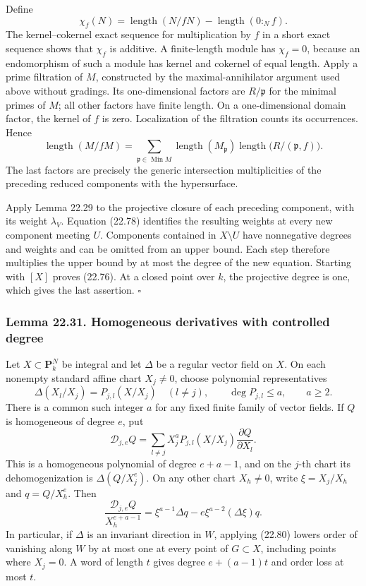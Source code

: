 \documentclass[
  11pt,
  a4paper,
]{article}
\newcounter{none} %
\begin{document}
Define \[
 \chi_f(N)=\operatorname{length}(N/fN)
                   -\operatorname{length}(0:_N f).
 \tag{22.77}
\] The kernel--cokernel exact sequence for multiplication by \(f\) in a
short exact sequence shows that \(\chi_f\) is additive. A finite-length
module has \(\chi_f=0\), because an endomorphism of such a module has
kernel and cokernel of equal length. Apply a prime filtration of \(M\),
constructed by the maximal-annihilator argument used above without
gradings. Its one-dimensional factors are \(R/\mathfrak p\) for the
minimal primes of \(M\); all other factors have finite length. On a
one-dimensional domain factor, the kernel of \(f\) is zero. Localization
of the filtration counts its occurrences. Hence \[
 \operatorname{length}(M/fM)
   =\sum_{\mathfrak p\in\operatorname{Min}M}
       \operatorname{length}(M_{\mathfrak p})
       \operatorname{length}\bigl(R/(\mathfrak p,f)\bigr).
 \tag{22.78}
\] The last factors are precisely the generic intersection
multiplicities of the preceding reduced components with the
hypersurface.

Apply Lemma 22.29 to the projective closure of each preceding component,
with its weight \(\lambda_V\). Equation (22.78) identifies the resulting
weights at every new component meeting \(U\). Components contained in
\(X\setminus U\) have nonnegative degrees and weights and can be omitted
from an upper bound. Each step therefore multiplies the upper bound by
at most the degree of the new equation. Starting with \([X]\) proves
(22.76). At a closed point over \(k\), the projective degree is one,
which gives the last assertion. \(\square\)

\subsubsection{Lemma 22.31. Homogeneous derivatives with controlled
degree}\label{lemma-22.31.-homogeneous-derivatives-with-controlled-degree}

Let \(X\subset\mathbf P^N_k\) be integral and let \(\Delta\) be a
regular vector field on \(X\). On each nonempty standard affine chart
\(X_j\ne0\), choose polynomial representatives \[
 \Delta(X_l/X_j)=P_{j,l}(X/X_j)\quad(l\ne j),
 \qquad \deg P_{j,l}\le a,
 \qquad a\ge2.
 \tag{22.79}
\] There is a common such integer \(a\) for any fixed finite family of
vector fields. If \(Q\) is homogeneous of degree \(e\), put \[
 \mathcal D_{j,e}Q
   =\sum_{l\ne j}X_j^aP_{j,l}(X/X_j)
                       \frac{\partial Q}{\partial X_l}.
 \tag{22.80}
\] This is a homogeneous polynomial of degree \(e+a-1\), and on the
\(j\)-th chart its dehomogenization is \(\Delta(Q/X_j^e)\). On any other
chart \(X_h\ne0\), write \(\xi=X_j/X_h\) and \(q=Q/X_h^e\). Then \[
 \frac{\mathcal D_{j,e}Q}{X_h^{e+a-1}}
  =\xi^{a-1}\Delta q-e\xi^{a-2}(\Delta\xi)q.
 \tag{22.81}
\] In particular, if \(\Delta\) is an invariant direction in \(W\),
applying (22.80) lowers order of vanishing along \(W\) by at most one at
every point of \(G\subset X\), including points where \(X_j=0\). A word
of length \(t\) gives degree \(e+(a-1)t\) and order loss at most \(t\).
\end{document}
